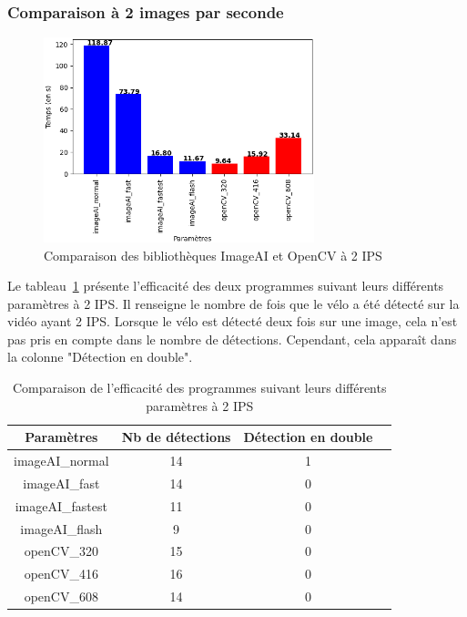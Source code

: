 \subsubsection{Comparaison à 2 images par seconde}
\label{sec:comparaisonIA:resultats:2fps}

\begin{figure}[H]
    \centering
    \includegraphics[width=0.7\textwidth]{img/result_2fps.png}
    \caption{Comparaison des bibliothèques ImageAI et OpenCV à 2 IPS}
\end{figure}

Le tableau~\ref{tab_2fps} présente l'efficacité des deux programmes suivant leurs différents paramètres à 2 IPS.
Il renseigne le nombre de fois que le vélo a été détecté sur la vidéo ayant 2 IPS.
Lorsque le vélo est détecté deux fois sur une image, cela n'est pas pris en compte dans le nombre de détections.
Cependant, cela apparaît dans la colonne "Détection en double".

\begin{table}[H]
    \centering
    \begin{tabular}{|c|c|c|c|}
        \hline
        \rowcolor{tableColorDark} Paramètres & Nb de détections & Détection en double \\
        \hline

        imageAI\_normal                      & 14               & 1                   \\\hline
        imageAI\_fast                        & 14               & 0                   \\\hline
        imageAI\_fastest                     & 11               & 0                   \\\hline
        imageAI\_flash                       & 9                & 0                   \\\hline
        openCV\_320                          & 15               & 0                   \\\hline
        openCV\_416                          & 16               & 0                   \\\hline
        openCV\_608                          & 14               & 0                   \\\hline
    \end{tabular}
    \caption{Comparaison de l'efficacité des programmes suivant leurs différents paramètres à 2 IPS}
    \label{tab_2fps}
\end{table}

